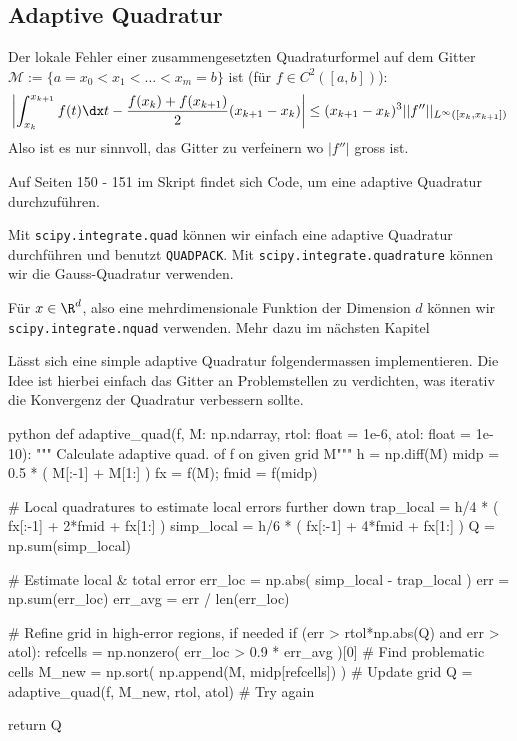 
\newsection

\subsection{Adaptive Quadratur}
Der lokale Fehler einer zusammengesetzten Quadraturformel auf dem Gitter $\mathcal{M} := \{ a = x_0 < x_1 < \dots < x_m = b \}$ ist (für $f \in C^2([a, b])$):
\begin{align*}
    \left| \int_{x_k}^{x_{k + 1}} f(t) \dx t - \frac{f(x_k) + f(x_{k + 1})}{2}(x_{k + 1} - x_k) \right| \leq (x_{k + 1} - x_k)^3 ||f''||_{L^\infty([x_k, x_{k + 1}])}
\end{align*}
Also ist es nur sinnvoll, das Gitter zu verfeinern wo $|f''|$ gross ist.

Auf Seiten 150 - 151 im Skript findet sich Code, um eine adaptive Quadratur durchzuführen.

 Mit \texttt{scipy.integrate.quad} können wir einfach eine adaptive Quadratur durchführen und benutzt \texttt{QUADPACK}.
Mit \texttt{scipy.integrate.quadrature} können wir die Gauss-Quadratur verwenden.

Für $x \in \R^d$, also eine mehrdimensionale Funktion der Dimension $d$ können wir \texttt{scipy.integrate.nquad} verwenden. Mehr dazu im nächsten Kapitel

\innumpy Lässt sich eine simple adaptive Quadratur folgendermassen implementieren. Die Idee ist hierbei einfach das Gitter an Problemstellen zu verdichten, was iterativ die Konvergenz der Quadratur verbessern sollte.

\begin{code}{python}
def adaptive_quad(f, M: np.ndarray, rtol: float = 1e-6, atol: float = 1e-10):
    """ Calculate adaptive quad. of f on given grid M"""
    h = np.diff(M)
    midp = 0.5 * ( M[:-1] + M[1:] )
    fx   = f(M); fmid = f(midp)
    
    # Local quadratures to estimate local errors further down
    trap_local = h/4 * ( fx[:-1] + 2*fmid + fx[1:] )
    simp_local = h/6 * ( fx[:-1] + 4*fmid + fx[1:] )
    Q = np.sum(simp_local)
    
    # Estimate local & total error
    err_loc = np.abs( simp_local - trap_local )
    err = np.sum(err_loc)
    err_avg = err / len(err_loc)
    
    # Refine grid in high-error regions, if needed
    if (err > rtol*np.abs(Q) and err > atol):
        refcells = np.nonzero( err_loc > 0.9 * err_avg )[0]     # Find problematic cells
        M_new = np.sort( np.append(M, midp[refcells]) )         # Update grid
        Q = adaptive_quad(f, M_new, rtol, atol)         # Try again
    
    return Q
\end{code}

